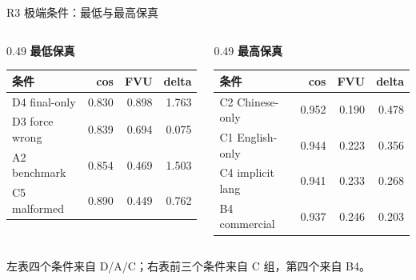 \begin{frame}{R3 极端条件：最低与最高保真}
\small
\begin{columns}[T,onlytextwidth]
\begin{column}{0.49\linewidth}
\textbf{最低保真}
\begin{tabular}{lrrr}
\toprule
条件 & cos & FVU & delta \\
\midrule
D4 final-only & 0.830 & 0.898 & 1.763 \\
D3 force wrong & 0.839 & 0.694 & 0.075 \\
A2 benchmark & 0.854 & 0.469 & 1.503 \\
C5 malformed & 0.890 & 0.449 & 0.762 \\
\bottomrule
\end{tabular}
\end{column}
\begin{column}{0.49\linewidth}
\textbf{最高保真}
\begin{tabular}{lrrr}
\toprule
条件 & cos & FVU & delta \\
\midrule
C2 Chinese-only & 0.952 & 0.190 & 0.478 \\
C1 English-only & 0.944 & 0.223 & 0.356 \\
C4 implicit lang & 0.941 & 0.233 & 0.268 \\
B4 commercial & 0.937 & 0.246 & 0.203 \\
\bottomrule
\end{tabular}
\end{column}
\end{columns}

\vspace{0.5em}
左表四个条件来自 D/A/C；右表前三个条件来自 C 组，第四个来自 B4。
\end{frame}
